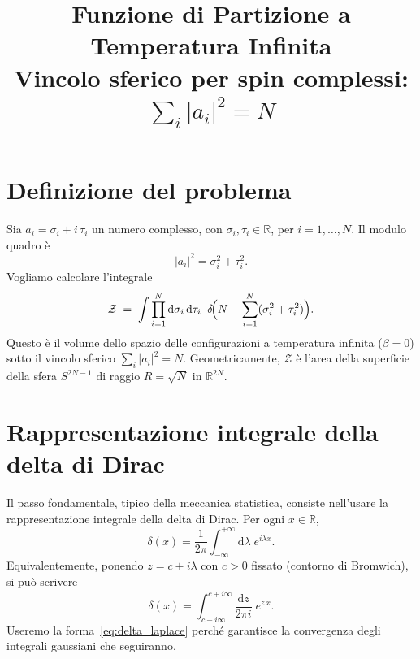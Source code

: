 \documentclass[a4paper,11pt]{article}
\title{Funzione di Partizione a Temperatura Infinita \\[4pt]
       \large Vincolo sferico per spin complessi: $\sum_i |a_i|^2 = N$}
\author{}
\date{}
\newcommand{\de}{\mathrm{d}}
\begin{document}
\maketitle

\section{Definizione del problema}

Sia $a_i = \sigma_i + i\,\tau_i$ un numero complesso, con
$\sigma_i, \tau_i \in \mathbb{R}$, per $i = 1, \dots, N$.
Il modulo quadro è
\begin{equation}
  |a_i|^2 = \sigma_i^2 + \tau_i^2 .
\end{equation}
Vogliamo calcolare l'integrale
\begin{equation}\label{eq:Z}
  \mathcal{Z}
  \;=\; \int \prod_{i=1}^{N} \de\sigma_i\,\de\tau_i \;\;
        \delta\!\Bigl(N - \sum_{i=1}^{N} (\sigma_i^2 + \tau_i^2)\Bigr) .
\end{equation}
Questo è il volume dello spazio delle configurazioni a temperatura
infinita ($\beta = 0$) sotto il vincolo sferico
$\sum_i |a_i|^2 = N$.
Geometricamente, $\mathcal{Z}$ è l'area della superficie della sfera
$S^{2N-1}$ di raggio $R = \sqrt{N}$ in $\mathbb{R}^{2N}$.

\section{Rappresentazione integrale della delta di Dirac}

Il passo fondamentale, tipico della meccanica statistica, consiste
nell'usare la rappresentazione integrale della delta di Dirac.  Per ogni
$x \in \mathbb{R}$,
\begin{equation}\label{eq:delta_fourier}
  \delta(x) = \frac{1}{2\pi} \int_{-\infty}^{+\infty} \de\lambda \;
              e^{i\lambda x} .
\end{equation}
Equivalentemente, ponendo $z = c + i\lambda$ con $c > 0$ fissato
(contorno di Bromwich), si può scrivere
\begin{equation}\label{eq:delta_laplace}
  \delta(x) = \int_{c - i\infty}^{c + i\infty}
              \frac{\de z}{2\pi i}\; e^{z\,x} .
\end{equation}
Useremo la forma~\eqref{eq:delta_laplace} perché garantisce la
convergenza degli integrali gaussiani che seguiranno.
\end{document}
